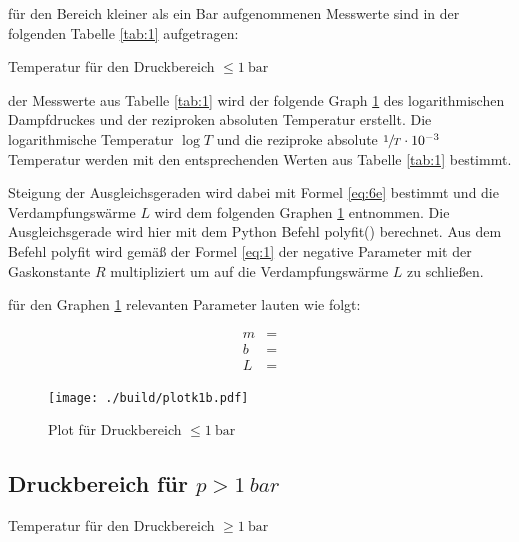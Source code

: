 \justifying für den Bereich kleiner als ein Bar aufgenommenen Messwerte sind in der folgenden Tabelle \ref{tab:1} aufgetragen:

\begin{table}
    \centering
    
    \caption{Temperatur für den Druckbereich $\leq \SI{1}{\bar}$}
    \label{tab:1}
\end{table}

\justifying der Messwerte aus Tabelle \ref{tab:1} wird der folgende Graph \ref{fig:4} des logarithmischen Dampfdruckes und
der reziproken absoluten Temperatur erstellt. Die logarithmische Temperatur $\log{T}$ und die reziproke absolute $\sfrac{1}{T} \cdot 10^{-3}$ 
Temperatur werden mit den entsprechenden Werten aus Tabelle \ref{tab:1} bestimmt.
\newpage

\justifying Steigung der Ausgleichsgeraden wird dabei mit Formel \eqref{eq:6e} bestimmt und die Verdampfungswärme $L$ wird dem 
folgenden Graphen \ref{fig:4} entnommen. Die Ausgleichsgerade wird hier mit dem Python Befehl polyfit() \cite{uncertainties} berechnet. Aus dem
Befehl polyfit wird gemäß der Formel \eqref{eq:1} der negative Parameter mit der Gaskonstante $R$ multipliziert um auf die Verdampfungswärme $L$ 
zu schließen.

\justifying für den Graphen \ref{fig:4} relevanten Parameter lauten wie folgt:

\begin{subequations} \label{eq:7}
\begin{align}
    m &= \text{} \label{eq:7a}\\
    b &= \text{} \label{eq:7b}\\
    L &= \text{} \label{eq:7c}
\end{align}
\end{subequations}


\begin{figure}[H]
    \centering
    \texttt{[image: ./build/plotk1b.pdf]}
    \caption{Plot für Druckbereich $\leq \SI{1}{\bar}$}
    \label{fig:4}
\end{figure}

\subsection{Druckbereich für $p > \SI{1}{bar}$}

\begin{table}[H]
    \centering
    
    \caption{Temperatur für den Druckbereich $\geq \SI{1}{\bar}$}
    \label{tab:2}
\end{table}

